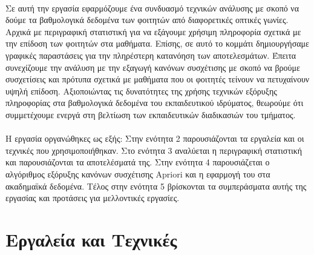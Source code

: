 \documentclass[12pt,a4paper,final]{article}
\begin{document}
\paragraph{}
Σε αυτή την εργασία εφαρμόζουμε ένα συνδυασμό τεχνικών ανάλυσης με σκοπό να δούμε τα βαθμολογικά δεδομένα των φοιτητών από διαφορετικές οπτικές γωνίες. Αρχικά με περιγραφική στατιστική\foreignlanguage{english}{ \cite{descriptiveStats}}  για να εξάγουμε χρήσιμη πληροφορία σχετικά με την επίδοση των φοιτητών στα μαθήματα. Επίσης, σε αυτό το κομμάτι δημιουργήσαμε  γραφικές παραστάσεις  για την πληρέστερη κατανόηση των αποτελεσμάτων. Έπειτα συνεχίζουμε την ανάλυση με την εξαγωγή κανόνων συσχέτισης\foreignlanguage{english}{ \cite{associatio_rules7}} με σκοπό να βρούμε συσχετίσεις και πρότυπα σχετικά με μαθήματα που  οι φοιτητές τείνουν να πετυχαίνουν υψηλή επίδοση. Αξιοποιώντας τις   δυνατότητες της χρήσης τεχνικών εξόρυξης πληροφορίας στα βαθμολογικά δεδομένα του εκπαιδευτικού ιδρύματος, θεωρούμε ότι συμμετέχουμε ενεργά στη βελτίωση των εκπαιδευτικών διαδικασιών του τμήματος. 

\paragraph{}
Η εργασία οργανώθηκες ως εξής: Στην  ενότητα 2 παρουσιάζονται τα εργαλεία και οι τεχνικές που χρησιμοποιήθηκαν. Στο ενότητα 3 αναλύεται η περιγραφική στατιστική και παρουσιάζονται τα αποτελέσματά της. Στην ενότητα 4 παρουσιάζεται  ο αλγόριθμος  εξόρυξης κανόνων συσχέτισης  \foreignlanguage{english}{Apriori} και η εφαρμογή του στα ακαδημαϊκά δεδομένα. Τέλος στην ενότητα 5 βρίσκονται τα συμπεράσματα αυτής της εργασίας και προτάσεις για μελλοντικές εργασίες.

\clearpage

\section{Εργαλεία και Τεχνικές}
\end{document}

